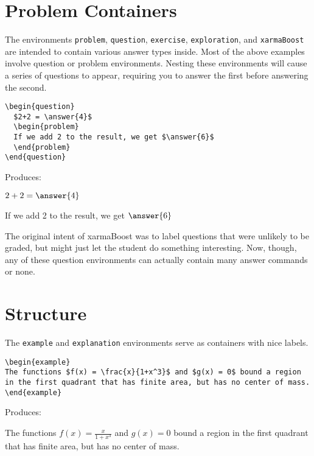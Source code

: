 \documentclass{ximera}
\begin{document}
\section{Problem Containers} \label{ProblemContainers}

\begin{example}
The environments \verb!problem!, \verb!question!, \verb!exercise!, \verb!exploration!, and \verb!xarmaBoost! are intended to contain various answer types inside. Most of the above examples involve question or problem environments. Nesting these environments will cause a series of questions to appear, requiring you to answer the first before answering the second.

\begin{verbatim}
\begin{question}
  $2+2 = \answer{4}$
  \begin{problem}
  If we add 2 to the result, we get $\answer{6}$
  \end{problem}
\end{question}
\end{verbatim}

Produces:

\begin{question}
  $2+2 = \answer{4}$
  \begin{problem}
  If we add 2 to the result, we get $\answer{6}$
  \end{problem}
\end{question}

\begin{remark} 
The original intent of xarmaBoost was to label questions that were unlikely to be graded, but might just let the student do something interesting. Now, though, any of these question environments can actually contain many answer commands or none.
\end{remark}
\end{example}

\section{Structure} \label{StructuralEnvironments}

\begin{example}
The \verb!example! and \verb!explanation! environments serve as containers with nice labels. 

\begin{verbatim}
\begin{example}
The functions $f(x) = \frac{x}{1+x^3}$ and $g(x) = 0$ bound a region in the first quadrant that has finite area, but has no center of mass. 
\end{example}
\end{verbatim}

Produces:
\begin{example}
The functions $f(x) = \frac{x}{1+x^3}$ and $g(x) = 0$ bound a region in the first quadrant that has finite area, but has no center of mass. 
\end{example}
\end{example}
\end{document}
